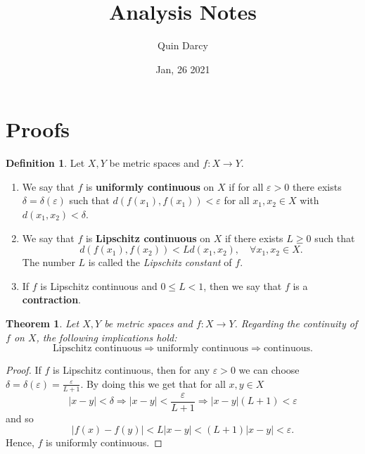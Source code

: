 \documentclass[12pt]{article}
\newtheorem{theorem}{Theorem}[section]
\theoremstyle{definition}
\newtheorem{definition}{Definition}[section]
\theoremstyle{definition}
\newcommand{\abs}[1]{\lvert #1 \rvert}
\begin{document}
\title{Analysis Notes}
\author{Quin Darcy}
\date{Jan, 26 2021}
\maketitle
\section{Proofs}
    \begin{definition}
        Let $X, Y$ be metric spaces and $f:X\to Y$. 
            \begin{enumerate}[label=(\roman*)]
                \item We say that $f$ is \textbf{uniformly continuous} on $X$
                    if for all $\varepsilon>0$ there exists
                    $\delta=\delta(\varepsilon)$ such that $d(f(x_1),
                    f(x_1))<\varepsilon$ for all $x_1, x_2\in X$ with $d(x_1,
                    x_2)<\delta$.
                \item We say that $f$ is \textbf{Lipschitz continuous} on $X$
                    if there exists $L\geq 0$ such that 
                        \begin{equation*}
                            d(f(x_1), f(x_2))<Ld(x_1, x_2), \quad\forall x_1,
                            x_2\in X.
                        \end{equation*}
                    The number $L$ is called the \textit{Lipschitz constant} of
                    $f$.
                \item If $f$ is Lipschitz continuous and $0\leq L<1$, then we
                    say that $f$ is a \textbf{contraction}.
            \end{enumerate}
    \end{definition}
    \begin{theorem}
        Let $X, Y$ be metric spaces and $f:X\to Y$. Regarding the continuity
        of $f$ on $X$, the following implications hold:
            \begin{equation*}
                \text{Lipschitz continuous}\Rightarrow\text{uniformly
                continuous}\Rightarrow\text{continuous}.
            \end{equation*}
    \end{theorem}
        \begin{proof}
            If $f$ is Lipschitz continuous, then for any $\varepsilon>0$ we can
            choose $\delta=\delta(\varepsilon)=\frac{\varepsilon}{L+1}$. By
            doing this we get that for all $x, y\in X$
                \begin{equation*}
                    \abs{x-y}<\delta\Rightarrow\abs{x-y}<\frac{\varepsilon}{L+1}\Rightarrow\abs{x-y}(L+1)<\varepsilon
                \end{equation*}
            and so 
                \begin{equation*}
                    \abs{f(x)-f(y)}<L\abs{x-y}<(L+1)\abs{x-y}<\varepsilon.
                \end{equation*}
            Hence, $f$ is uniformly continuous. 
        \end{proof}
\end{document}
